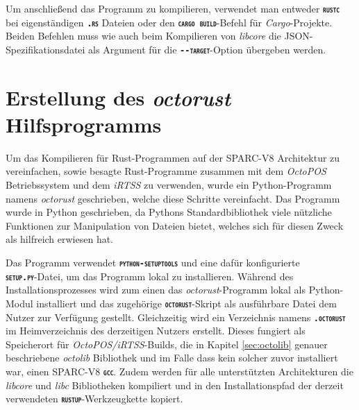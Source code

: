 Um anschließend das Programm zu kompilieren,
verwendet man entweder \texttt{\textsc{\textbf{rustc}}} bei eigenständigen
\texttt{\textsc{\textbf{.rs}}} Dateien oder den \texttt{\textsc{\textbf{cargo build}}}-Befehl für \textit{Cargo}-Projekte.
Beiden Befehlen muss wie auch beim Kompilieren von \textit{libcore} die 
JSON-Spezifikationsdatei als Argument für die \texttt{\textsc{\textbf{-{}-target}}}-Option übergeben werden. 

\section{Erstellung des \textit{octorust} Hilfsprogramms}

Um das Kompilieren für Rust-Programmen
auf der SPARC-V8 Architektur zu vereinfachen, sowie
besagte Rust-Programme zusammen mit dem \textit{OctoPOS} Betriebssystem und dem \textit{iRTSS} zu verwenden,
wurde ein Python-Programm namens \textit{octorust} geschrieben, welche diese Schritte
vereinfacht.
Das Programm wurde in Python geschrieben, da Pythons Standardbibliothek viele nützliche Funktionen zur Manipulation
von Dateien bietet, welches sich für diesen Zweck als hilfreich erwiesen hat.

Das Programm verwendet \texttt{\textsc{\textbf{python-setuptools}}} und eine dafür konfigurierte \\
\texttt{\textsc{\textbf{setup.py}}}-Datei, um das Programm lokal zu installieren.
Während des Installationsprozesses wird zum einen das \textit{octorust}-Programm lokal als Python-Modul 
installiert und das zugehörige \texttt{\textsc{\textbf{octorust}}}-Skript als ausführbare Datei dem Nutzer zur 
Verfügung gestellt.
Gleichzeitig wird ein Verzeichnis namens \texttt{\textsc{\textbf{.octorust}}}
im Heimverzeichnis des derzeitigen Nutzers erstellt.
Dieses fungiert als Speicherort für \textit{OctoPOS/iRTSS}-Builds, die in Kapitel \ref{sec:octolib} genauer
beschriebene \textit{octolib} Bibliothek und im Falle dass kein solcher zuvor installiert war, einen SPARC-V8
\texttt{\textsc{\textbf{gcc}}}.
Zudem werden für alle unterstützten Architekturen die \textit{libcore} und \textit{libc} Bibliotheken
kompiliert und in den Installationspfad der derzeit verwendeten
\texttt{\textsc{\textbf{rustup}}}-Werkzeugkette kopiert.

